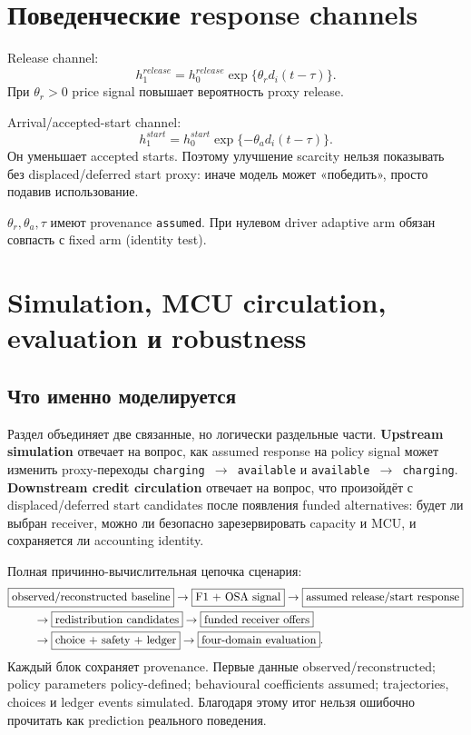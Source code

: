 \documentclass[11pt,a4paper]{article}
\newcommand{\term}[1]{\textbf{#1}}
\newcommand{\code}[1]{\texttt{#1}}
\begin{document}
\section{Поведенческие response channels}
Release channel:
\[
h^{release}_{1}=h^{release}_{0}\exp\{\theta_r d_i(t-\tau)\}.
\]
При $\theta_r>0$ price signal повышает вероятность proxy release.

Arrival/accepted-start channel:
\[
h^{start}_{1}=h^{start}_{0}\exp\{-\theta_a d_i(t-\tau)\}.
\]
Он уменьшает accepted starts. Поэтому улучшение scarcity нельзя показывать без displaced/deferred start proxy: иначе модель может «победить», просто подавив использование.

$\theta_r,\theta_a,\tau$ имеют provenance \code{assumed}. При нулевом driver adaptive arm обязан совпасть с fixed arm (identity test).

\section{Simulation, MCU circulation, evaluation и robustness}
\subsection{Что именно моделируется}
Раздел объединяет две связанные, но логически раздельные части. \term{Upstream simulation} отвечает на вопрос, как assumed response на policy signal может изменить proxy-переходы \code{charging $\to$ available} и \code{available $\to$ charging}. \term{Downstream credit circulation} отвечает на вопрос, что произойдёт с displaced/deferred start candidates после появления funded alternatives: будет ли выбран receiver, можно ли безопасно зарезервировать capacity и MCU, и сохраняется ли accounting identity.

Полная причинно-вычислительная цепочка сценария:
\[
\begin{aligned}
&\boxed{\text{observed/reconstructed baseline}}
\to\boxed{\text{F1 + OSA signal}}
\to\boxed{\text{assumed release/start response}}\\
&\hspace{8mm}\to\boxed{\text{redistribution candidates}}
\to\boxed{\text{funded receiver offers}}\\
&\hspace{8mm}\to\boxed{\text{choice + safety + ledger}}
\to\boxed{\text{four-domain evaluation}}.
\end{aligned}
\]
Каждый блок сохраняет provenance. Первые данные observed/reconstructed; policy parameters policy-defined; behavioural coefficients assumed; trajectories, choices и ledger events simulated. Благодаря этому итог нельзя ошибочно прочитать как prediction реального поведения.
\end{document}
